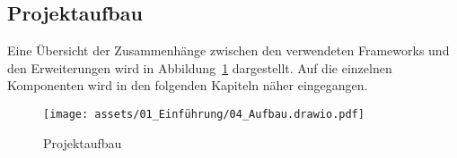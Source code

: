\subsection{Projektaufbau}

Eine Übersicht der Zusammenhänge zwischen den verwendeten Frameworks und den Erweiterungen wird in Abbildung~\ref{asset:Projektaufbau} dargestellt.
Auf die einzelnen Komponenten wird in den folgenden Kapiteln näher eingegangen.

\begin{figure}[H]
    \centering
    \texttt{[image: assets/01\_Einführung/04\_Aufbau.drawio.pdf]}
    \caption{Projektaufbau}
    \label{asset:Projektaufbau}
\end{figure}
